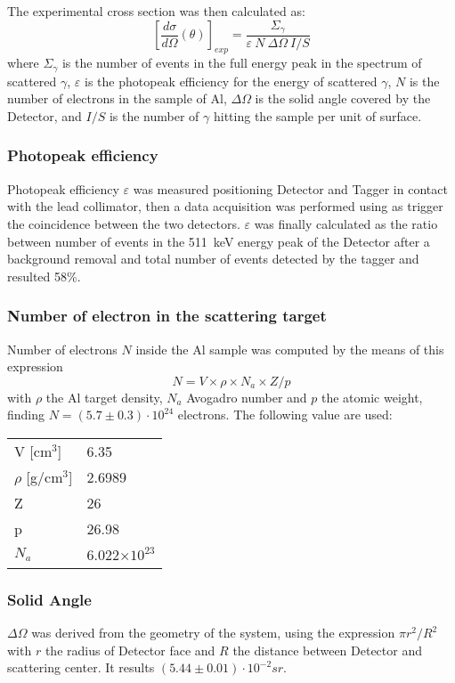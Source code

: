 The experimental cross section was then calculated as:
\begin{equation*}
	\left[\frac{d\sigma}{d\Omega}(\theta)\right]_{exp}=\frac{\Sigma_\gamma}{\varepsilon\ N\ \Delta\Omega\ I/S}
\end{equation*}
 where $\Sigma_\gamma$ is the number of events in the full energy peak in the spectrum of scattered $\gamma$, $\varepsilon$ is the photopeak efficiency for the energy of scattered  $\gamma$, $N$ is the number of electrons in the sample of Al, $\Delta\Omega$ is the solid angle covered by the Detector, and $I/S$ is the number of $\gamma$ hitting the sample per unit of surface. 
 
 
\subsubsection*{Photopeak efficiency}
Photopeak efficiency $\varepsilon$ was measured positioning Detector and Tagger in contact with the lead collimator, then a data acquisition was performed using as trigger the coincidence between the two detectors.
 $\varepsilon$ was finally calculated as the ratio between number of events in the 511~keV energy peak of the Detector after a background removal and total number of events detected by the tagger and resulted 58\%.
 \subsubsection*{Number of electron in the scattering target}
 Number of electrons $N$ inside the Al sample was computed by the means of this expression 
\[
N=V\times \rho\times N_a\times Z/p
\]
with $\rho$ the Al target density, $N_a$ Avogadro number and $p$  the atomic weight, finding $N=(5.7 \pm 0.3)\cdot10^{24}$ electrons. The following value are used:
\begin{table}[H]
\centering
\begin{tabular}{ll}
\toprule
\toprule
V [cm$^3$] & 6.35 \\
$\rho$ [g/cm$^3$] & 2.6989\\
Z & 26 \\
p & 26.98 \\
$N_a$ & 6.022$\times 10^{23}$ \\
\bottomrule
\bottomrule
\end{tabular}
\end{table}
 
\subsubsection*{Solid Angle }
$\Delta\Omega$ was derived from the geometry of the system, using the expression $\pi r^2/R^2$ with $r$ the radius of Detector face and $R$ the distance between Detector and scattering center. It results $(5.44\pm0.01)\cdot 10^{-2} sr$. 
  
